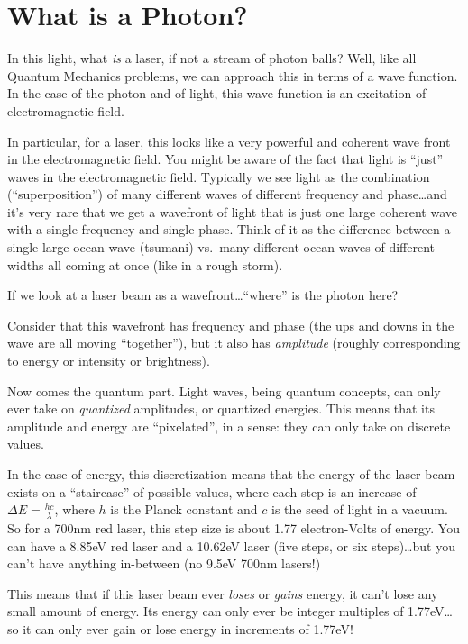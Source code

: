 \documentclass[]{article}
\begin{document}
\hypertarget{what-is-a-photon}{%
\section{What is a Photon?}\label{what-is-a-photon}}

In this light, what \emph{is} a laser, if not a stream of photon balls? Well,
like all Quantum Mechanics problems, we can approach this in terms of a wave
function. In the case of the photon and of light, this wave function is an
excitation of electromagnetic field.

In particular, for a laser, this looks like a very powerful and coherent wave
front in the electromagnetic field. You might be aware of the fact that light is
``just'' waves in the electromagnetic field. Typically we see light as the
combination (``superposition'') of many different waves of different frequency
and phase\ldots and it's very rare that we get a wavefront of light that is just
one large coherent wave with a single frequency and single phase. Think of it as
the difference between a single large ocean wave (tsumani) vs.~many different
ocean waves of different widths all coming at once (like in a rough storm).

If we look at a laser beam as a wavefront\ldots{}``where'' is the photon here?

Consider that this wavefront has frequency and phase (the ups and downs in the
wave are all moving ``together''), but it also has \emph{amplitude} (roughly
corresponding to energy or intensity or brightness).

Now comes the quantum part. Light waves, being quantum concepts, can only ever
take on \emph{quantized} amplitudes, or quantized energies. This means that its
amplitude and energy are ``pixelated'', in a sense: they can only take on
discrete values.

In the case of energy, this discretization means that the energy of the laser
beam exists on a ``staircase'' of possible values, where each step is an
increase of \(\Delta E = \frac{h c}{\lambda}\), where \(h\) is the Planck
constant and \(c\) is the seed of light in a vacuum. So for a 700nm red laser,
this step size is about 1.77 electron-Volts of energy. You can have a 8.85eV red
laser and a 10.62eV laser (five steps, or six steps)\ldots but you can't have
anything in-between (no 9.5eV 700nm lasers!)

This means that if this laser beam ever \emph{loses} or \emph{gains} energy, it
can't lose any small amount of energy. Its energy can only ever be integer
multiples of 1.77eV\ldots so it can only ever gain or lose energy in increments
of 1.77eV!
\end{document}
